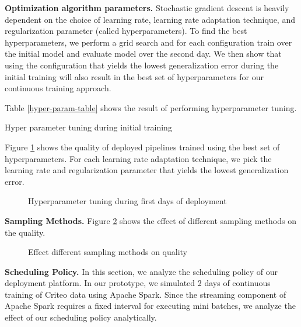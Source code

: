 \textbf{Optimization algorithm parameters. }
Stochastic gradient descent is heavily dependent on the choice of learning rate, learning rate adaptation technique, and regularization parameter (called hyperparameters). 
To find the best hyperparameters, we perform a grid search and for each configuration train over the initial model and evaluate model over the second day.
We then show that using the configuration that yields the lowest generalization error during the initial training will also result in the best set of hyperparameters for our continuous training approach.

Table \ref{hyper-param-table} shows the result of performing hyperparameter tuning.
\begin{table}[!h]
\centering
\begin{adjustbox}{max width=\textwidth}

\end{adjustbox}
\caption{Hyper parameter tuning during initial training}
\label{hyper-param-table}
\end{table}

Figure \ref{hyper-param-figure} shows the quality of deployed pipelines trained using the best set of hyperparameters. 
For each learning rate adaptation technique, we pick the learning rate and regularization parameter that yields the lowest generalization error.

\begin{figure}[!h]
\centering
\resizebox{\columnwidth}{!}{}
\caption{Hyperparameter tuning during first days of deployment}
\label{hyper-param-figure}
\end{figure}

\textbf{Sampling Methods. }
Figure \ref{sampling-method-figure} shows the effect of different sampling methods on the quality.
\begin{figure}[!h]
\centering
\resizebox{\columnwidth}{!}{}
\caption{Effect different sampling methods on quality}
\label{sampling-method-figure}
\end{figure}

\textbf{Scheduling Policy. }
In this section, we analyze the scheduling policy of our deployment platform.
In our prototype, we simulated 2 days of continuous training of Criteo data using Apache Spark.
Since the streaming component of Apache Spark requires a fixed interval for executing mini batches, we analyze the effect of our scheduling policy analytically.

